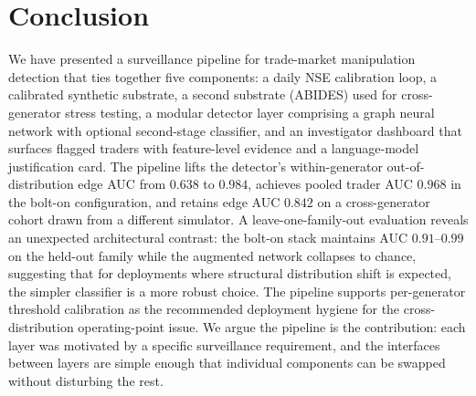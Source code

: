 \documentclass[10pt,twocolumn,letterpaper]{article}
\begin{document}
\section{Conclusion}
\label{sec:concl}

We have presented a surveillance pipeline for trade-market
manipulation detection that ties together five components: a daily
NSE calibration loop, a calibrated synthetic substrate, a second
substrate (ABIDES) used for cross-generator stress testing, a
modular detector layer comprising a graph neural network with optional
second-stage classifier, and an investigator dashboard that surfaces
flagged traders with feature-level evidence and a language-model
justification card. The pipeline lifts the detector's within-generator
out-of-distribution edge AUC from \(0.638\) to \(0.984\), achieves
pooled trader AUC \(0.968\) in the bolt-on configuration, and retains
edge AUC \(0.842\) on a cross-generator cohort drawn from a different
simulator. A leave-one-family-out evaluation reveals an unexpected
architectural contrast: the bolt-on stack maintains AUC
\(0.91\)--\(0.99\) on the held-out family while the augmented network
collapses to chance, suggesting that for deployments where structural
distribution shift is expected, the simpler classifier is a more
robust choice. The pipeline supports per-generator threshold
calibration as the recommended deployment hygiene for the
cross-distribution operating-point issue. We argue the pipeline is the
contribution: each layer was motivated by a specific surveillance
requirement, and the interfaces between layers are simple enough that
individual components can be swapped without disturbing the rest.
\end{document}

